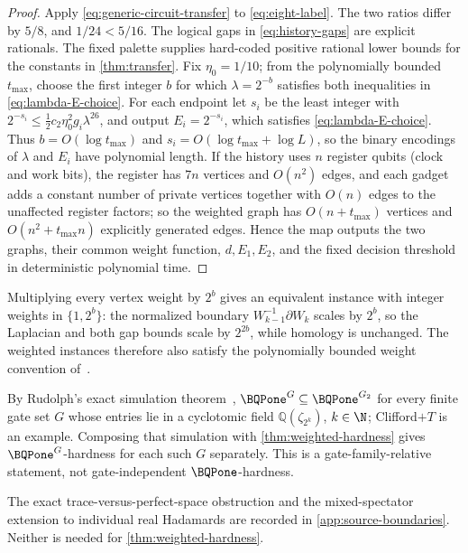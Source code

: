 \begin{proof}
Apply \cref{eq:generic-circuit-transfer} to \cref{eq:eight-label}.  The two
ratios differ by \(5/8\), and \(1/24<5/16\).  The logical gaps in
\cref{eq:history-gaps} are explicit rationals.  The fixed palette supplies
hard-coded positive rational lower bounds for the constants in
\cref{thm:transfer}.  Fix \(\eta_0=1/10\); from the polynomially bounded
\(t_{\max}\), choose the first integer \(b\) for which
\(\lambda=2^{-b}\) satisfies both inequalities in
\cref{eq:lambda-E-choice}.  For each endpoint let \(s_i\) be the least
integer with \(2^{-s_i}\le\frac12c_2\eta_0^2g_i\lambda^{26}\), and output
\(E_i=2^{-s_i}\), which satisfies \cref{eq:lambda-E-choice}.  Thus
\(b=O(\log t_{\max})\) and \(s_i=O(\log t_{\max}+\log L)\), so the binary
encodings of \(\lambda\) and \(E_i\) have polynomial length.  If the history
uses \(n\) register qubits (clock and work bits), the register has \(7n\)
vertices and \(O(n^2)\) edges, and each gadget adds a constant number of
private vertices together with \(O(n)\) edges to the unaffected register
factors; so the weighted graph has \(O(n+t_{\max})\) vertices and
\(O(n^2+t_{\max}n)\) explicitly generated edges.  Hence the map
outputs the two graphs, their common weight function, \(d,E_1,E_2\), and the
fixed decision threshold in deterministic polynomial time.
\end{proof}

\begin{remark}
\label{rem:integer-weights}
Multiplying every vertex weight by \(2^{b}\) gives an equivalent instance
with integer weights in \(\{1,2^{b}\}\): the normalized boundary
\(W_{k-1}^{-1}\partial W_k\) scales by \(2^{b}\), so the Laplacian and both
gap bounds scale by \(2^{2b}\), while homology is unchanged.  The weighted
instances therefore also satisfy the polynomially bounded weight convention
of~\cite{lowe2026normalized}.
\end{remark}

\begin{remark}
\label{rem:gate-sets}
By Rudolph's exact simulation theorem~\cite[Theorem~3.4]{rudolph2026universal},
\(\BQPone^{G}\subseteq\BQPone^{G_2}\) for every finite gate set \(G\) whose
entries lie in a cyclotomic field \(\mathbb Q(\zeta_{2^k})\), \(k\in\N\);
Clifford\(+T\) is an example.  Composing that simulation with
\cref{thm:weighted-hardness} gives \(\BQPone^{G}\)-hardness for each such
\(G\) separately.  This is a gate-family-relative statement, not
gate-independent \(\BQPone\)-hardness.
\end{remark}

The exact trace-versus-perfect-space obstruction and the mixed-spectator
extension to individual real Hadamards are recorded in
\cref{app:source-boundaries}.  Neither is needed for
\cref{thm:weighted-hardness}.

